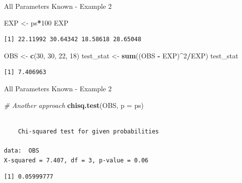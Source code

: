 \documentclass[
  ignorenonframetext,
]{beamer}
\newenvironment{Shaded}{\begin{snugshade}}{\end{snugshade}}
\newcommand{\AttributeTok}[1]{\textcolor[rgb]{0.13,0.29,0.53}{#1}}
\newcommand{\CommentTok}[1]{\textcolor[rgb]{0.56,0.35,0.01}{\textit{#1}}}
\newcommand{\DecValTok}[1]{\textcolor[rgb]{0.00,0.00,0.81}{#1}}
\newcommand{\FunctionTok}[1]{\textcolor[rgb]{0.13,0.29,0.53}{\textbf{#1}}}
\newcommand{\NormalTok}[1]{#1}
\newcommand{\OtherTok}[1]{\textcolor[rgb]{0.56,0.35,0.01}{#1}}
\newcommand{\SpecialCharTok}[1]{\textcolor[rgb]{0.81,0.36,0.00}{\textbf{#1}}}
\begin{document}
\begin{frame}[fragile]{All Parameters Known - Example 2}
\protect\hypertarget{all-parameters-known---example-2-4}{}
\begin{Shaded}
\begin{Highlighting}[]
\NormalTok{EXP }\OtherTok{\textless{}{-}}\NormalTok{ ps}\SpecialCharTok{*}\DecValTok{100}
\NormalTok{EXP}
\end{Highlighting}
\end{Shaded}

\begin{verbatim}
[1] 22.11992 30.64342 18.58618 28.65048
\end{verbatim}

\begin{Shaded}
\begin{Highlighting}[]
\NormalTok{OBS }\OtherTok{\textless{}{-}} \FunctionTok{c}\NormalTok{(}\DecValTok{30}\NormalTok{, }\DecValTok{30}\NormalTok{, }\DecValTok{22}\NormalTok{, }\DecValTok{18}\NormalTok{)}
\NormalTok{test\_stat }\OtherTok{\textless{}{-}} \FunctionTok{sum}\NormalTok{((OBS }\SpecialCharTok{{-}}\NormalTok{ EXP)}\SpecialCharTok{\^{}}\DecValTok{2}\SpecialCharTok{/}\NormalTok{EXP)}
\NormalTok{test\_stat}
\end{Highlighting}
\end{Shaded}

\begin{verbatim}
[1] 7.406963
\end{verbatim}
\end{frame}

\begin{frame}[fragile]{All Parameters Known - Example 2}
\protect\hypertarget{all-parameters-known---example-2-5}{}
\begin{Shaded}
\begin{Highlighting}[]
\CommentTok{\# Another approach}
\FunctionTok{chisq.test}\NormalTok{(OBS, }\AttributeTok{p =}\NormalTok{ ps)}
\end{Highlighting}
\end{Shaded}

\begin{verbatim}

    Chi-squared test for given probabilities

data:  OBS
X-squared = 7.407, df = 3, p-value = 0.06
\end{verbatim}

\begin{Shaded}
\end{Shaded}

\begin{verbatim}
[1] 0.05999777
\end{verbatim}
\end{frame}
\end{document}
